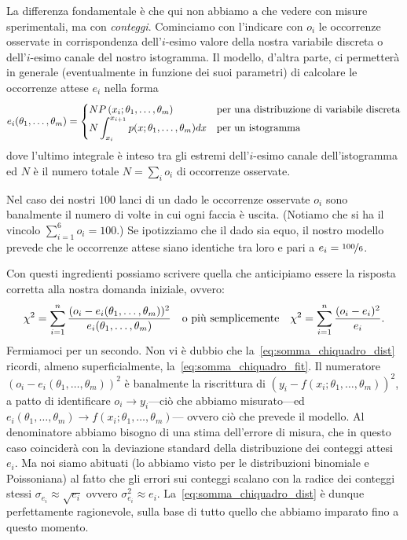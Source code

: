 La differenza fondamentale è che qui non abbiamo a che vedere con misure
sperimentali, ma con \emph{conteggi}. Cominciamo con l'indicare con $o_i$ le
occorrenze osservate in corrispondenza dell'$i$-esimo valore della nostra
variabile discreta o dell'$i$-esimo canale del nostro istogramma. Il modello,
d'altra parte, ci permetterà in generale (eventualmente in funzione dei
suoi parametri) di calcolare le occorrenze attese $e_i$ nella forma
\begin{align}
  e_i(\theta_1, \ldots, \theta_m) =
  \begin{cases}
    \displaystyle N \displaystyle P\left(x_i; \theta_1, \ldots, \theta_m\right) &
    \text{per una distribuzione di variabile discreta}\\
    \displaystyle N \int_{x_i}^{x_{i+1}} p(x; \theta_1, \ldots, \theta_m)dx
    & \text{per un istogramma}
  \end{cases}
\end{align}
dove l'ultimo integrale è inteso tra gli estremi dell'$i$-esimo canale
dell'istogramma ed $N$ è il numero totale $N = \sum_i o_i$ di occorrenze
osservate.

\begin{examplebox}
  \begin{example}
    Nel caso dei nostri $100$ lanci di un dado le occorrenze osservate $o_i$
    sono banalmente il numero di volte in cui ogni faccia è uscita.
    (Notiamo che si ha il vincolo $\sum_{i=1}^6 o_i = 100$.) Se ipotizziamo che
    il dado sia equo, il nostro modello prevede che le occorrenze attese siano
    identiche tra loro e pari a $e_i = \nicefrac{100}{6}$.
  \end{example}
\end{examplebox}

Con questi ingredienti possiamo scrivere quella che anticipiamo essere la
risposta corretta alla nostra domanda iniziale, ovvero:
\begin{align}\label{eq:somma_chiquadro_dist}
  \chi^2 = \sum_{i = 1}^n
  \frac{(o_i - e_i(\theta_1, \ldots, \theta_m))^2}
       {e_i(\theta_1, \ldots, \theta_m)}
       \quad \text{o più semplicemente} \quad
       \chi^2 = \sum_{i = 1}^n\frac{(o_i - e_i)^2}{e_i}.
\end{align}
Fermiamoci per un secondo. Non vi è dubbio che
la~\eqref{eq:somma_chiquadro_dist} ricordi, almeno superficialmente,
la~\eqref{eq:somma_chiquadro_fit}.
Il numeratore $(o_i - e_i(\theta_1, \ldots, \theta_m))^2$ è banalmente la
riscrittura di $(y_i - f(x_i; \theta_1, \ldots, \theta_m))^2$,
a patto di identificare $o_i \rightarrow y_i$---ciò che abbiamo misurato---ed
$e_i(\theta_1,\ldots,\theta_m) \rightarrow f(x_i;\theta_1,\ldots,\theta_m)$---%
ovvero ciò che prevede il modello.
Al denominatore abbiamo bisogno di una stima dell'errore di misura, che in
questo caso coinciderà con la deviazione standard della distribuzione dei
conteggi attesi $e_i$. Ma noi siamo abituati (lo abbiamo visto per le
distribuzioni binomiale e Poissoniana) al fatto che gli errori sui conteggi
scalano con la radice dei conteggi stessi $\sigma_{e_i} \approx \sqrt{e_i}$
ovvero $\sigma^2_{e_i} \approx e_i$. La~\eqref{eq:somma_chiquadro_dist} è
dunque perfettamente ragionevole, sulla base di tutto quello che abbiamo
imparato fino a questo momento.

